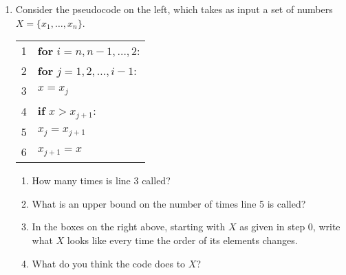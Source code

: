\documentclass[a4paper,12pt]{article}
\begin{document}
\begin{enumerate}
\vfill

\item Consider the pseudocode on the left, which takes as input a set of numbers $X = \{x_1,\dots,x_n\}$.
\newcommand\ind{${}$\hspace{10pt}}
\newcommand\yfac{1.5}
\begin{center}
\begin{tabular}{r l}
1 & \textbf{for} $i=n,n-1,\dots,2$: \\
2 & \ind \textbf{for} $j=1,2,\dots,i-1$: \\
3 & \ind \ind $x = x_j$ \\
4 & \ind \ind \textbf{if} $x > x_{j+1}$: \\
5 & \ind \ind \ind $x_j = x_{j+1}$ \\
6 & \ind \ind \ind $x_{j+1} = x$
\end{tabular}
\hspace{2cm}
\end{center}
\begin{enumerate}
\item How many times is line 3 called?
\item What is an upper bound on the number of times line 5 is called?
\item In the boxes on the right above, starting with $X$ as given in step 0, write what $X$ looks like every time the order of its elements changes.
\item What do you think the code does to $X$?
\end{enumerate}

\clearpage


\end{enumerate}
\end{document}
